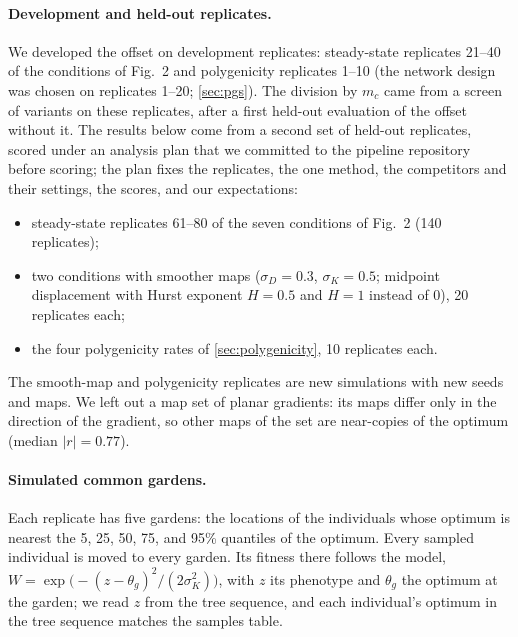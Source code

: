 \paragraph{Development and held-out replicates.} We developed the offset on
development replicates: steady-state replicates 21--40 of the conditions
of Fig.~2 and polygenicity replicates 1--10 (the network design was chosen
on replicates 1--20; \cref{sec:pgs}). The division by $m_c$ came from a
screen of variants on these replicates, after a first held-out evaluation
of the offset without it. The results below come from a second set of
held-out replicates, scored under an analysis plan that we committed to the
pipeline repository before scoring; the plan fixes the replicates, the one
\ecolocator method, the competitors and their settings, the scores, and our
expectations:
\begin{itemize}
\item steady-state replicates 61--80 of the seven conditions of Fig.~2
  (140 replicates);
\item two conditions with smoother maps ($\sigma_D=0.3$, $\sigma_K=0.5$;
  midpoint displacement with Hurst exponent $H=0.5$ and $H=1$ instead of
  0), 20 replicates each;
\item the four polygenicity rates of \cref{sec:polygenicity}, 10 replicates
  each.
\end{itemize}
The smooth-map and polygenicity replicates are new simulations with new
seeds and maps. We left out a map set of planar gradients: its maps differ
only in the direction of the gradient, so other maps of the set are
near-copies of the optimum (median $|r| = 0.77$).

\paragraph{Simulated common gardens.} Each replicate has five gardens: the
locations of the individuals whose optimum is nearest the 5, 25, 50, 75,
and 95\% quantiles of the optimum. Every sampled individual is moved to
every garden. Its fitness there follows the \slim model,
$W = \exp\!\big(-(z - \theta_g)^2 / (2\sigma_K^2)\big)$, with $z$ its
phenotype and $\theta_g$ the optimum at the garden; we read $z$ from the
tree sequence, and each individual's optimum in the tree sequence matches
the samples table.

